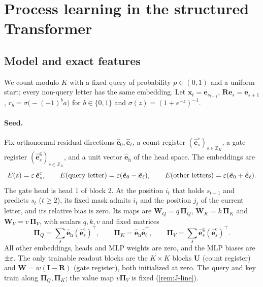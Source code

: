 \section{Process learning in the structured Transformer}
\label{app:joint}
\label{app:step-supplied-routing}



\subsection{Model and exact features}

We count modulo $K$ with a fixed query of probability $p\in(0,1)$ and a uniform start; every non-query letter has the same embedding. Let $\bm x_t=\bm e_{s_{t-1}}$, $\mathbf R\bm e_s=\bm e_{s+1}$, $r_b=\sigma\bigl(-(-1)^ba\bigr)$ for $b\in\{0,1\}$ and $\sigma(z)=(1+e^{-z})^{-1}$.

\paragraph{Seed.} Fix orthonormal residual directions $\hat{\bm e}_0,\hat{\bm e}_\ell$, a count register $(\hat{\bm e}^{\mathrm c}_s)_{s\in\mathbb Z_K}$, a gate register
$(\hat{\bm e}^{\mathrm g}_s)_{s\in\mathbb Z_K}$, and a unit vector $\hat{\bm e}_{\mathrm h}$ of the head space. The embeddings are
\[
 E(s)=\varepsilon\,\hat{\bm e}^{\mathrm c}_s,\qquad E(\text{query letter})=\varepsilon(\hat{\bm e}_0-\hat{\bm e}_\ell),\qquad E(\text{other letters})=\varepsilon(\hat{\bm e}_0+\hat{\bm e}_\ell).
\]
The gate head is head $1$ of block $2$. At the position $i_t$ that holds $s_{t-1}$ and predicts $s_t$ ($t\ge2$), its fixed mask admits
$i_t$ and the position $j_t$ of the current letter, and its relative bias is zero. Its maps are $\mathbf W_Q=q\,\bm\Pi_Q$, $\mathbf W_K=k\,\bm\Pi_K$ and
$\mathbf W_V=v\,\bm\Pi_V$, with scalars $q,k,v$ and fixed matrices
\[
 \bm\Pi_Q=\textstyle\sum_s\hat{\bm e}_{\mathrm h}(\hat{\bm e}^{\mathrm c}_s)^{\!\top},\qquad \bm\Pi_K=\hat{\bm e}_{\mathrm h}\hat{\bm e}_\ell^{\top},\qquad \bm\Pi_V=\sum_s\hat{\bm e}^{\mathrm g}_s(\hat{\bm e}^{\mathrm c}_s)^{\!\top}.
\]
All other embeddings, heads and MLP weights are zero, and the MLP biases are $\pm\varepsilon$. The only trainable readout blocks are the
$K\times K$ blocks $\mathbf U$ (count register) and $\mathbf W=w(\mathbf I-\mathbf R)$ (gate register), both initialized at zero.
The query and key train along $\bm\Pi_Q,\bm\Pi_K$; the value map $v\bm\Pi_V$ is fixed (\cref{rem:J-line}).

